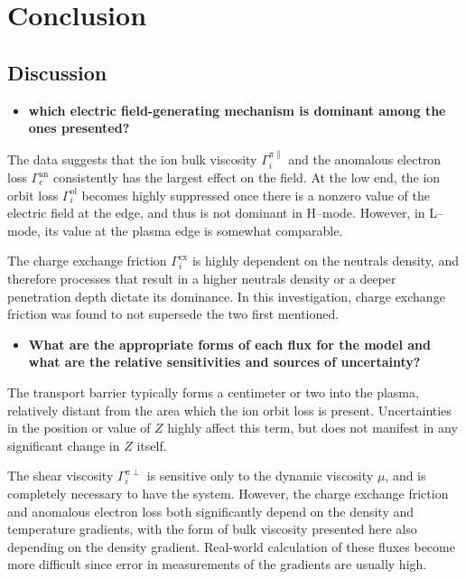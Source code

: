 \chapter{Conclusion} \label{chapter:conclusion}
\section{Discussion} \label{sec:discussion}
\begin{itemize}
	\item \textbf{which electric field-generating mechanism is dominant among the ones presented?}
\end{itemize}
The data suggests that the ion bulk viscosity $\Gamma_i^{\pi\parallel}$ and the anomalous electron loss $\Gamma_e^\text{an}$ consistently has the largest effect on the field.
At the low end, the ion orbit loss $\Gamma_i^\text{ol}$ becomes highly suppressed once there is a nonzero value of the electric field at the edge, and thus is not dominant in H--mode.
However, in L--mode, its value at the plasma edge is somewhat comparable.

The charge exchange friction $\Gamma_i^\text{cx}$ is highly dependent on the neutrals density, and therefore processes that result in a higher neutrals density or a deeper penetration depth dictate its dominance.
In this investigation, charge exchange friction was found to not supersede the two first mentioned.

\begin{itemize}
	\item \textbf{What are the appropriate forms of each flux for the model and what are the relative sensitivities and sources of uncertainty?}
\end{itemize}
The transport barrier typically forms a centimeter or two into the plasma, relatively distant from the area which the ion orbit loss is present.
Uncertainties in the position or value of $Z$ highly affect this term, but does not manifest in any significant change in $Z$ itself.

The shear viscosity $\Gamma_i^{\pi\perp}$ is sensitive only to the dynamic viscosity $\mu$, and is completely necessary to have the system.
However, the charge exchange friction and anomalous electron loss both significantly depend on the density and temperature gradients, with the form of bulk viscosity presented here also depending on the density gradient.
Real-world calculation of these fluxes become more difficult since error in measurements of the gradients are usually high.

